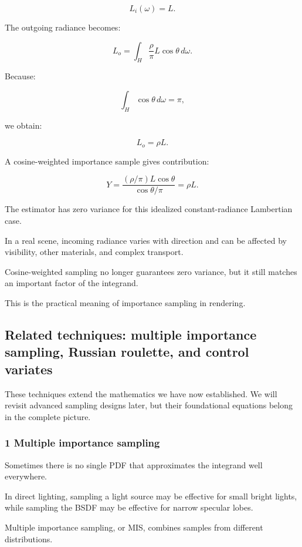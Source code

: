 \[
 L_i(\omega)=L.
\]

The outgoing radiance becomes:

\[
 L_o= \int_H \frac\rho\pi L\cos\theta\,d\omega.
\]

Because:

\[
 \int_H\cos\theta\,d\omega=\pi,
\]

we obtain:

\[
 \boxed{L_o=\rho L}.
\]

A cosine-weighted importance sample gives contribution:

\[
 Y= \frac{ (\rho/\pi)L\cos\theta }{ \cos\theta/\pi } =\rho L.
\]

The estimator has zero variance for this idealized constant-radiance Lambertian case.

In a real scene, incoming radiance varies with direction and can be affected by visibility, other materials, and complex transport.

Cosine-weighted sampling no longer guarantees zero variance, but it still matches an important factor of the integrand.

This is the practical meaning of importance sampling in rendering.

\subsection{Related techniques: multiple importance sampling, Russian roulette, and control variates}\label{02-foundations-ii-ch031-related-techniques-multiple-importance-sampling-russian-roulette-and-control-variates}

These techniques extend the mathematics we have now established. We will revisit advanced sampling designs later, but their foundational equations belong in the complete picture.

\subsubsection{1 Multiple importance sampling}\label{02-foundations-ii-ch031-multiple-importance-sampling}

Sometimes there is no single PDF that approximates the integrand well everywhere.

In direct lighting, sampling a light source may be effective for small bright lights, while sampling the BSDF may be effective for narrow specular lobes.

Multiple importance sampling, or MIS, combines samples from different distributions.

